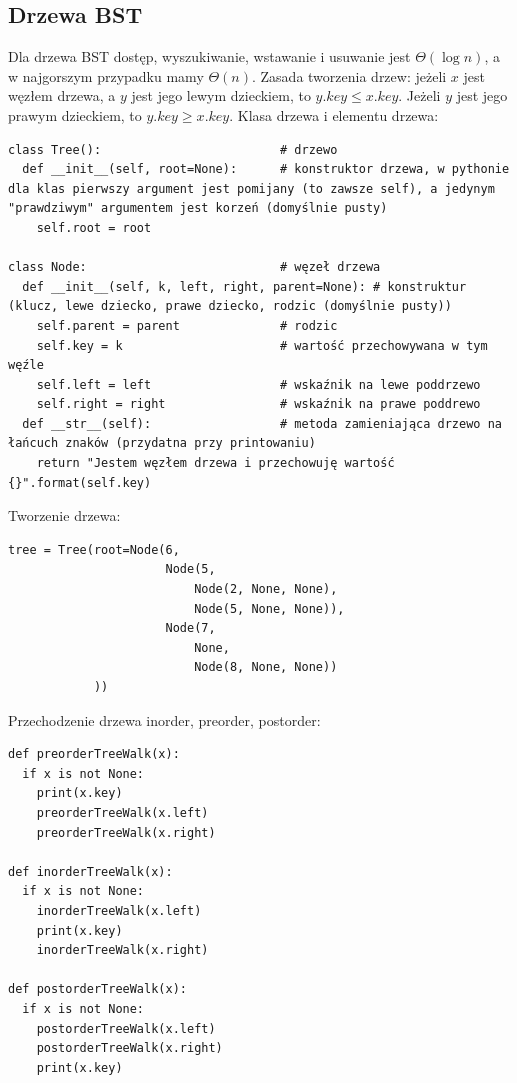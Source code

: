 \documentclass[10pt, oneside]{article}
\theoremstyle{remark}
\begin{document}
\subsection{Drzewa BST}
Dla drzewa BST dostęp, wyszukiwanie, wstawanie i usuwanie jest $\Theta(\log n)$, a w najgorszym przypadku mamy $\Theta(n)$.
Zasada tworzenia drzew: jeżeli $x$ jest węzłem drzewa, a $y$ jest jego lewym dzieckiem, to $y.key \leq x.key$.
Jeżeli $y$ jest jego prawym dzieckiem, to $y.key \geq x.key$.
Klasa drzewa i elementu drzewa:
\begin{verbatim}
class Tree():                         # drzewo
  def __init__(self, root=None):      # konstruktor drzewa, w pythonie dla klas pierwszy argument jest pomijany (to zawsze self), a jedynym "prawdziwym" argumentem jest korzeń (domyślnie pusty)
    self.root = root                  

class Node:                           # węzeł drzewa
  def __init__(self, k, left, right, parent=None): # konstruktur (klucz, lewe dziecko, prawe dziecko, rodzic (domyślnie pusty))
    self.parent = parent              # rodzic 
    self.key = k                      # wartość przechowywana w tym węźle
    self.left = left                  # wskaźnik na lewe poddrzewo
    self.right = right                # wskaźnik na prawe poddrewo
  def __str__(self):                  # metoda zamieniająca drzewo na łańcuch znaków (przydatna przy printowaniu)
    return "Jestem węzłem drzewa i przechowuję wartość {}".format(self.key)
\end{verbatim}
Tworzenie drzewa:
\begin{verbatim}
tree = Tree(root=Node(6, 
                      Node(5, 
                          Node(2, None, None), 
                          Node(5, None, None)), 
                      Node(7, 
                          None, 
                          Node(8, None, None))
            ))
\end{verbatim}
Przechodzenie drzewa inorder, preorder, postorder:
\begin{verbatim}
def preorderTreeWalk(x):
  if x is not None:
    print(x.key)
    preorderTreeWalk(x.left)
    preorderTreeWalk(x.right)

def inorderTreeWalk(x):
  if x is not None:
    inorderTreeWalk(x.left)
    print(x.key)
    inorderTreeWalk(x.right)

def postorderTreeWalk(x):
  if x is not None:
    postorderTreeWalk(x.left)
    postorderTreeWalk(x.right)
    print(x.key)
\end{verbatim}
\end{document}

